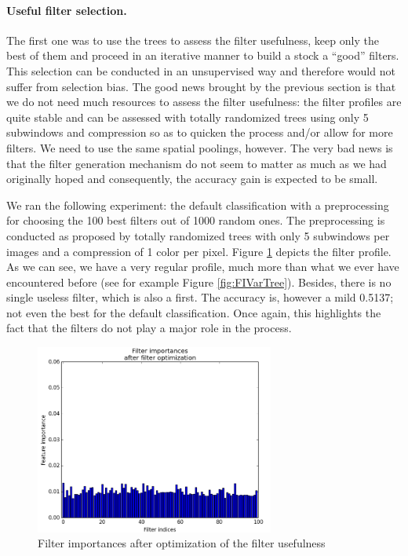 \documentclass[a4paper]{report}
\begin{document}
	\paragraph{Useful filter selection.}
	The first one was to use the trees to assess the filter usefulness, keep only the best of them and proceed in an iterative manner to build a stock a ``good'' filters. This selection can be conducted in an unsupervised way and therefore would not suffer from selection bias. The good news brought by the previous section is that we do not need much resources to assess the filter usefulness: the filter profiles are quite stable and can be assessed with totally randomized trees using only 5 subwindows and compression so as to quicken the process and/or allow for more filters. We need to use the same spatial poolings, however. The very bad news is that the filter generation mechanism do not seem to matter as much as we had originally hoped and consequently, the accuracy gain is expected to be small.
	\par
	We ran the following experiment: the default classification with a preprocessing for choosing the 100 best filters out of 1000 random ones. The preprocessing is conducted as proposed by totally randomized trees with only 5 subwindows per images and a compression of 1 color per pixel. 
	Figure \ref{fig:FIOpti} depicts the filter profile. As we can see, we have a very regular profile, much more than what we ever have encountered before (see for example Figure \ref{fig:FIVarTree}). Besides, there is no single useless filter, which is also a first. The accuracy is, however a mild 0.5137; not even the best for the default classification.
	Once again, this highlights the fact that the filters do not play a major role in the process.
	
	
	\begin{figure}
		\centering
			\includegraphics[width=0.7\textwidth]{images/FIOpti.png}
		\caption{\label{fig:FIOpti}Filter importances after optimization of the filter usefulness}
	\end{figure}
\end{document}
